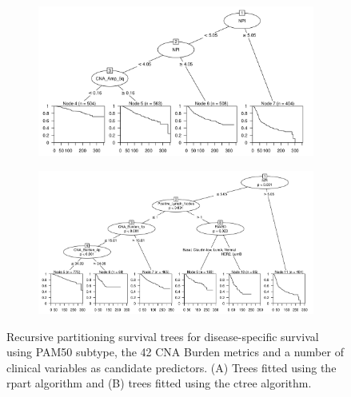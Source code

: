 \begin{figure}[!h]
\centering

\vspace{1cm}

\begin{subfigure}{\textwidth}
\subcaption{}
\includegraphics[width=1\textwidth]{../figures/Chapter_3/Clin_PA_PartyKit_Survival_Burden_DSS_PAM50.png}
\end{subfigure}

\vspace{2cm}

\begin{subfigure}{\textwidth}
\subcaption{}
\includegraphics[width=1\textwidth]{../figures/Chapter_3/Clin_PA_Ctree_Survival_Burden_DSS_PAM50.png}
\end{subfigure}

\vspace{1cm}

\caption[Recursive partitioning survival trees for disease-specific survival using PAM50 subtype, the 42 CNA Burden metrics and a number of clinical variables as candidate predictors.]{Recursive partitioning survival trees for disease-specific survival using PAM50 subtype, the 42 CNA Burden metrics and a number of clinical variables as candidate predictors. (A) Trees fitted using the rpart algorithm and (B) trees fitted using the ctree algorithm.}
\label{fig:PA_PAM50_CNA_Burden_DSS_Clin}
\end{figure}

